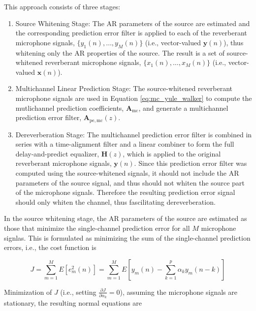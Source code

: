 This approach consists of three stages:

\begin{enumerate}
	\item Source Whitening Stage: The AR parameters of the source are estimated and the corresponding prediction error filter is applied to each of the reverberant microphone signals, $\{y_1(n), \dots, y_M(n)\}$ (i.e., vector-valued $\boldsymbol{y}(n)$), thus whitening only the AR properties of the source. The result is a set of source-whitened reverberant microphone signals, $\{x_1(n), \dots, x_M(n)\}$ (i.e., vector-valued $\boldsymbol{x}(n)$).
	\item Multichannel Linear Prediction Stage: The source-whitened reverberant microphone signals are used in Equation \ref{eq:mc_yule_walker} to compute the mutlichannel prediction coefficients, $\boldsymbol{A}_{\mathrm{mc}}$, and generate a multichannel prediction error filter, $\boldsymbol{A}_{\mathrm{pe,mc}}(z)$.
	\item Dereverberation Stage: The multichannel prediction error filter is combined in series with a time-alignment filter and a linear combiner to form the full delay-and-predict equalizer, $\boldsymbol{H}(z)$, which is applied to the original reverberant microphone signals, $\boldsymbol{y}(n)$. Since this prediction error filter was computed using the source-whitened signals, it should not include the AR parameters of the source signal, and thus should not whiten the source part of the microphone signals. Therefore the resulting prediction error signal should only whiten the channel, thus fascilitating dereverberation.
\end{enumerate}

In the source whitening stage, the AR parameters of the source are estimated as those that minimize the single-channel prediction error for all $M$ microphone signlas. This is formulated as minimizing the sum of the single-channel prediction errors, i.e., the cost function is

\begin{equation}
	J = \sum_{m=1}^{M} E[ e_m^2(n) ] = \sum_{m=1}^{M} E[ y_m(n) - \sum_{k=1}^{p} \alpha_k y_m(n-k) ]
\end{equation}

Minimization of $J$ (i.e., setting $\frac{\partial J}{\partial \alpha_k} = 0$), assuming the microphone signals are stationary, the resulting normal equations are


